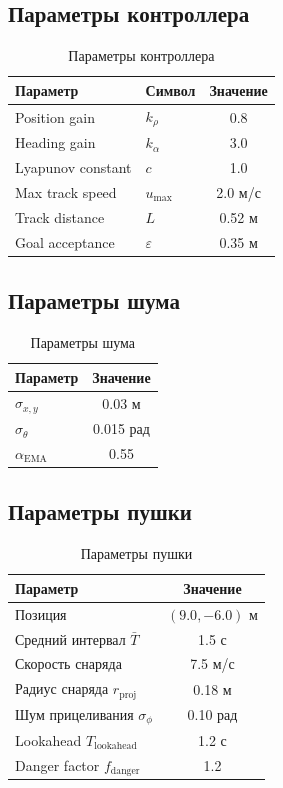 \documentclass[12pt, a4paper]{article}
\theoremstyle{definition}
\theoremstyle{plain}
\begin{document}
\subsection{Параметры контроллера}

\begin{table}[H]
\centering
\caption{Параметры контроллера}
\begin{tabular}{@{}llc@{}}
\toprule
Параметр & Символ & Значение \\
\midrule
Position gain     & $k_\rho$          & 0.8 \\
Heading gain      & $k_\alpha$        & 3.0 \\
Lyapunov constant & $c$               & 1.0 \\
Max track speed   & $u_{\max}$        & 2.0 м/с \\
Track distance    & $L$               & 0.52 м \\
Goal acceptance   & $\varepsilon$     & 0.35 м \\
\bottomrule
\end{tabular}
\end{table}

\subsection{Параметры шума}

\begin{table}[H]
\centering
\caption{Параметры шума}
\begin{tabular}{@{}lc@{}}
\toprule
Параметр & Значение \\
\midrule
$\sigma_{x,y}$ & 0.03 м \\
$\sigma_\theta$ & 0.015 рад \\
$\alpha_{\text{EMA}}$ & 0.55 \\
\bottomrule
\end{tabular}
\end{table}

\subsection{Параметры пушки}

\begin{table}[H]
\centering
\caption{Параметры пушки}
\begin{tabular}{@{}lc@{}}
\toprule
Параметр & Значение \\
\midrule
Позиция & $(9.0, -6.0)$ м \\
Средний интервал $\bar{T}$ & 1.5 с \\
Скорость снаряда & 7.5 м/с \\
Радиус снаряда $r_{\text{proj}}$ & 0.18 м \\
Шум прицеливания $\sigma_\phi$ & 0.10 рад \\
Lookahead $T_{\text{lookahead}}$ & 1.2 с \\
Danger factor $f_{\text{danger}}$ & 1.2 \\
\bottomrule
\end{tabular}
\end{table}
\end{document}
